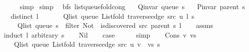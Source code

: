 \begin{isabellebody}
\ \ \ \ \isamarkupfalse%
\ simp\isanewline
{}\isamarkupfalse%
\ simp%
\endisatagproof
{\isafoldproof}%
%
\isadelimproof
\isanewline
%
\endisadelimproof
\isanewline
{}\isamarkupfalse%
\ {\isacharparenleft}{\kern0pt}\ bfs{\isacharparenright}{\kern0pt}\ list{\isacharunderscore}{\kern0pt}queue{\isacharunderscore}{\kern0pt}fold{\isacharunderscore}{\kern0pt}cong{\isacharcolon}{\kern0pt}\isanewline
\ \ \ {\isachardoublequoteopen}Q{\isacharunderscore}{\kern0pt}invar\ {\isacharparenleft}{\kern0pt}queue\ s{\isacharparenright}{\kern0pt}{\isachardoublequoteclose}\isanewline
\ \ \ {\isachardoublequoteopen}P{\isacharunderscore}{\kern0pt}invar\ {\isacharparenleft}{\kern0pt}parent\ s{\isacharparenright}{\kern0pt}{\isachardoublequoteclose}\isanewline
\ \ \ {\isachardoublequoteopen}distinct\ l{\isachardoublequoteclose}\isanewline
\ \ \isanewline
\ \ \ \ {\isachardoublequoteopen}Q{\isacharunderscore}{\kern0pt}list\ {\isacharparenleft}{\kern0pt}queue\ {\isacharparenleft}{\kern0pt}List{\isachardot}{\kern0pt}fold\ {\isacharparenleft}{\kern0pt}traverse{\isacharunderscore}{\kern0pt}edge\ src\ u{\isacharparenright}{\kern0pt}\ l\ s{\isacharparenright}{\kern0pt}{\isacharparenright}{\kern0pt}\ {\isacharequal}{\kern0pt}\isanewline
\ \ \ \ \ Q{\isacharunderscore}{\kern0pt}list\ {\isacharparenleft}{\kern0pt}queue\ s{\isacharparenright}{\kern0pt}\ {\isacharat}{\kern0pt}\ filter\ {\isacharparenleft}{\kern0pt}Not\ {\isasymcirc}\ is{\isacharunderscore}{\kern0pt}discovered\ src\ {\isacharparenleft}{\kern0pt}parent\ s{\isacharparenright}{\kern0pt}{\isacharparenright}{\kern0pt}\ l{\isachardoublequoteclose}\isanewline
%
\isadelimproof
\ \ %
\endisadelimproof
%
\isatagproof
{}\isamarkupfalse%
\ assms\isanewline
{}\isamarkupfalse%
\ {\isacharparenleft}{\kern0pt}induct\ l\ arbitrary{\isacharcolon}{\kern0pt}\ s{\isacharparenright}{\kern0pt}\isanewline
\ \ \isamarkupfalse%
\ Nil\isanewline
\ \ \isamarkupfalse%
\ {\isacharquery}{\kern0pt}case\isanewline
\ \ \ \ \isamarkupfalse%
\ simp\isanewline
{}\isamarkupfalse%
\isanewline
\ \ \isamarkupfalse%
\ {\isacharparenleft}{\kern0pt}Cons\ v\ vs{\isacharparenright}{\kern0pt}\isanewline
\ \ \isamarkupfalse%
\isanewline
\ \ \ \ {\isachardoublequoteopen}Q{\isacharunderscore}{\kern0pt}list\ {\isacharparenleft}{\kern0pt}queue\ {\isacharparenleft}{\kern0pt}List{\isachardot}{\kern0pt}fold\ {\isacharparenleft}{\kern0pt}traverse{\isacharunderscore}{\kern0pt}edge\ src\ u{\isacharparenright}{\kern0pt}\ {\isacharparenleft}{\kern0pt}v\ {\isacharhash}{\kern0pt}\ vs{\isacharparenright}{\kern0pt}\ s{\isacharparenright}{\kern0pt}{\isacharparenright}{\kern0pt}\ {\isacharequal}{\kern0pt}\isanewline

\end{isabellebody}

